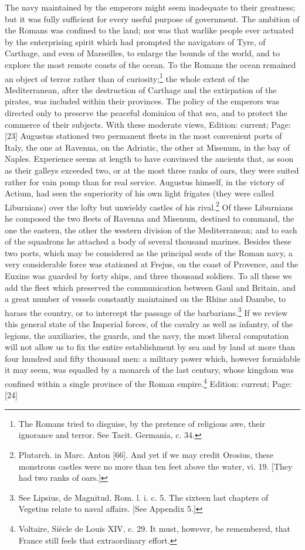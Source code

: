 The navy maintained by the emperors might seem inadequate to their greatness; but it was fully sufficient for every useful purpose of government. The ambition of the Romans was confined to the land; nor was that warlike people ever actuated by the enterprising spirit which had prompted the navigators of Tyre, of Carthage, and even of Marseilles, to enlarge the bounds of the world, and to explore the most remote coasts of the ocean. To the Romans the ocean remained an object of terror rather than of curiosity;\footnote{The Romans tried to disguise, by the pretence of religious awe, their ignorance and terror. See Tacit. Germania, c. 34.} the whole extent of the Mediterranean, after the destruction of Carthage and the extirpation of the pirates, was included within their provinces. The policy of the emperors was directed only to preserve the peaceful dominion of that sea, and to protect the commerce of their subjects. With these moderate views, Edition: current; Page: [23] Augustus stationed two permanent fleets in the most convenient ports of Italy, the one at Ravenna, on the Adriatic, the other at Misenum, in the bay of Naples. Experience seems at length to have convinced the ancients that, as soon as their galleys exceeded two, or at the most three ranks of oars, they were suited rather for vain pomp than for real service. Augustus himself, in the victory of Actium, had seen the superiority of his own light frigates (they were called Liburnians) over the lofty but unwieldy castles of his rival.\footnote{Plutarch. in Marc. Anton [66]. And yet if we may credit Orosius, these monstrous castles were no more than ten feet above the water, vi. 19. [They had two ranks of oars.]} Of these Liburnians he composed the two fleets of Ravenna and Misenum, destined to command, the one the eastern, the other the western division of the Mediterranean; and to each of the squadrons he attached a body of several thousand marines. Besides these two ports, which may be considered as the principal seats of the Roman navy, a very considerable force was stationed at Frejus, on the coast of Provence, and the Euxine was guarded by forty ships, and three thousand soldiers. To all these we add the fleet which preserved the communication between Gaul and Britain, and a great number of vessels constantly maintained on the Rhine and Danube, to harass the country, or to intercept the passage of the barbarians.\footnote{See Lipsius, de Magnitud. Rom. l. i. c. 5. The sixteen last chapters of Vegetius relate to naval affairs. [See Appendix 5.]} If we review this general state of the Imperial forces, of the cavalry as well as infantry, of the legions, the auxiliaries, the guards, and the navy, the most liberal computation will not allow us to fix the entire establishment by sea and by land at more than four hundred and fifty thousand men: a military power which, however formidable it may seem, was equalled by a monarch of the last century, whose kingdom was confined within a single province of the Roman empire.\footnote{Voltaire, Siècle de Louis XIV, c. 29. It must, however, be remembered, that France still feels that extraordinary effort.}
Edition: current; Page: [24]

